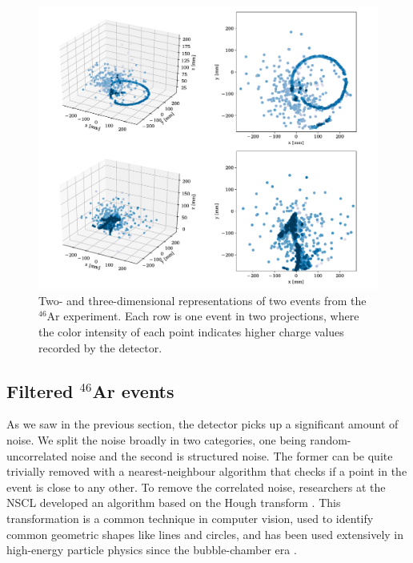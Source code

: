 \documentclass[review,number,sort&compress]{elsarticle}
\begin{document}
\begin{figure}[ht]
\centering
\includegraphics[width=\textwidth]{custom_work/examples_raw.pdf}
\caption[Displaying unfiltered events in 2D and 3D]{Two- and three-dimensional representations of two events from the ${}^{46}$Ar experiment. Each row is one event in two projections, where the color intensity of each point indicates higher charge values recorded by the detector.}\label{fig:samples}
\end{figure}

\subsection{Filtered \texorpdfstring{${}^{46}$Ar}{46Ar} events}\label{sec:filtered}


As we saw in the previous section, the detector picks up a significant amount of noise. We split the noise broadly in two categories,  one being random-uncorrelated noise and the second is structured noise. The former can be quite trivially removed with a nearest-neighbour algorithm that checks if a point in the event is close to any other. To remove the correlated noise, researchers at the NSCL developed an algorithm based on the Hough transform \cite{Newman1972}. This transformation is a common technique in computer vision, used to identify common geometric shapes like lines and circles, and has been used extensively in high-energy particle physics since the bubble-chamber era \cite{Hough:1959}.  %
\end{document}
